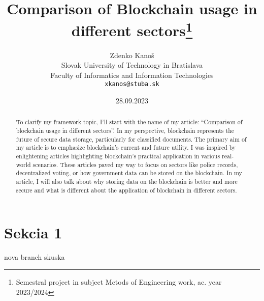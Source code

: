 \documentclass[10pt,twoside,english,a4paper]{article}
\title{Comparison of Blockchain usage in different sectors\thanks{Semestral project in subject Metods of Engineering work, ac. year 2023/2024}} %
\author{Zdenko Kanoš\\[2pt]
	{\small Slovak University of Technology in Bratislava}\\
	{\small Faculty of Informatics and Information Technologies}\\
	{\small \texttt{xkanos@stuba.sk}}
	}
\date{\small 28.09.2023} %
\begin{document}
\maketitle

\begin{abstract}
To clarify my framework topic, I'll start with the name of my article: “Comparison of
blockchain usage in different sectors”. In my perspective, blockchain represents the future
of secure data storage, particularly for classified documents. The primary aim of my article is
to emphasize blockchain’s current and future utility. I was inspired by enlightening articles
highlighting blockchain's practical application in various real-world scenarios. These articles
paved my way to focus on sectors like police records, decentralized voting, or how
government data can be stored on the blockchain. In my article, I will also talk about why
storing data on the blockchain is better and more secure and what is different about the
application of blockchain in different sectors.
\end{abstract}

\section{Sekcia 1}
nova branch skuska






\end{document}
